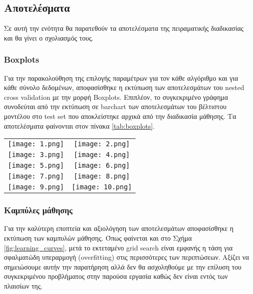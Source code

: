 \subsection{Αποτελέσματα}
Σε αυτή την ενότητα θα παρατεθούν τα αποτελέσματα της πειραματικής διαδικασίας 
και θα γίνει ο σχολιασμός τους.

\subsubsection{Boxplots}
Για την παρακολούθηση της επιλογής παραμέτρων για τον κάθε αλγόριθμο και για 
κάθε σύνολο δεδομένων, αποφασίσθηκε η εκτύπωση των αποτελεσμάτων του nested 
cross validation με την μορφή Boxplots. Επιπλέον, το συγκεκριμένο γράφημα 
συνοδεύται από την εκτύπωση σε barchart των αποτελεσμάτων του βέλτιστου μοντέλου
στο test set που αποκλείστηκε αρχικά από την διαδικασία μάθησης. 
Τα αποτελέσματα φαίνονται στον πίνακα \ref{tab:boxplots}.

\begin{table*}
	\centering
	\caption{Αποτελέσματα από την εκπαίδευση των αλγορίθμων και από την αξιολόγησή τους στο test set του κάθε συνόλου δεδομένων.}
	\label{tab:boxplots}
	\begin{tabular}{cc}
		\texttt{[image: 1.png]} &
		\texttt{[image: 2.png]} 
		 \\ %
		\texttt{[image: 3.png]} &
		\texttt{[image: 4.png]} 
		 \\ %
		\texttt{[image: 5.png]} &
		\texttt{[image: 6.png]} 
		 \\ %
		\texttt{[image: 7.png]} &
		\texttt{[image: 8.png]} 
		 \\ %
		\texttt{[image: 9.png]} &
		\texttt{[image: 10.png]}
	\end{tabular}
\end{table*}





\subsubsection{Καμπύλες μάθησης}

Για την καλύτερη εποπτεία και αξιολόγηση των αποτελεσμάτων αποφασίσθηκε η 
εκτύπωση των καμπυλών μάθησης. Όπως φαίνεται και στο Σχήμα \ref{fig:learning_curves},
 μετά το εκτεταμένο grid search είναι εμφανής η τάση για σφαλματώδη υπεραρμογή 
 (overfitting) στις περισσότερες των περιπτώσεων. Αξίζει να σημειώσουμε αυτήν 
 την παρατήρηση αλλά δεν θα ασχοληθούμε με την επίλυση του συγκεκριμένου 
 προβλήματος στην παρούσα εργασία καθώς δεν είναι εντός των πλαισίων της.

